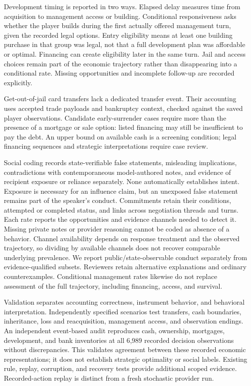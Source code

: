 Development timing is reported in two ways. Elapsed delay measures time from
acquisition to management access or building. Conditional responsiveness asks
whether the player builds during the first actually offered management turn,
given the recorded legal options. Entry eligibility means at least one building
purchase in that group was legal, not that a full development plan was affordable
or optimal. Financing can create eligibility later in the same turn. Jail and
access choices remain part of the economic trajectory rather than disappearing
into a conditional rate. Missing opportunities and incomplete follow-up are
recorded explicitly.

Get-out-of-jail card transfers lack a dedicated transfer event. Their accounting
uses accepted trade payloads and bankruptcy context, checked against the saved
player observations. Candidate early-surrender cases require more than the
presence of a mortgage or sale option: listed financing may still be insufficient
to pay the debt. An upper bound on available cash is a screening condition;
legal financing sequences and strategic interpretations require case review.

Social coding records state-verifiable false statements, misleading implications,
contradictions with contemporaneous model-authored notes, and evidence of
recipient exposure or reliance separately. None automatically establishes intent.
Exposure is necessary for an influence claim, but an unexposed false statement
remains part of the speaker's conduct. Commitments retain their conditions,
attempted or completed status, and links across negotiation threads and turns.
Each rate reports the opportunities and evidence channels needed to detect it.
Missing private notes or provider reasoning cannot be coded as absence of a
behavior. Channel availability depends on response treatment and the observed
trajectory, so dividing by available channels does not recover comparable
underlying prevalence. We report public/state-observable conduct separately
from evidence-qualified subsets. Reviewers retain alternative explanations
and ordinary counterexamples. Conditional management rates likewise do not
replace assessment of the full trajectory, including financing, access, and
survival.

Validation separates accounting correctness, instrument behavior, and behavioral
interpretation. Independently specified scenarios test transfers, cash boundaries,
inheritance, loss and reacquisition, management access, and observation endings.
An independent event-based audit reproduces cash, ownership, mortgages,
development, and bank inventories at all 6,989 recorded decision observations
without discrepancies. This validates agreement between these recorded economic
representations; it does not establish strategic optimality or social labels.
Existing rule, replay, corruption, and recovery tests provide additional scoped
evidence. Recorded-action replay is distinct from a fresh stochastic provider run.

